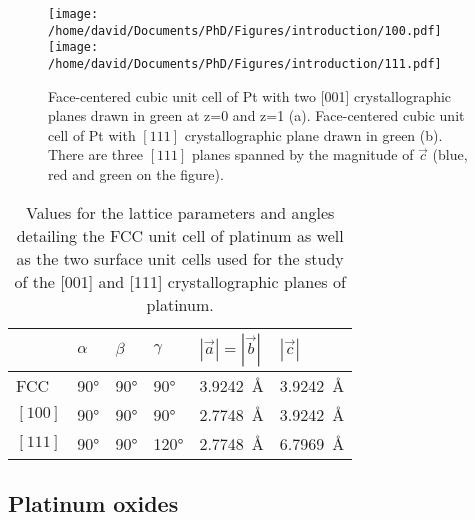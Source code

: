 \begin{figure}[!htb]
    \centering
    \texttt{[image: /home/david/Documents/PhD/Figures/introduction/100.pdf]}
    \texttt{[image: /home/david/Documents/PhD/Figures/introduction/111.pdf]}
    \caption{
        Face-centered cubic unit cell of Pt with two [001] crystallographic planes drawn in green at z=0 and z=1 (a).
        Face-centered cubic unit cell of Pt with $[111]$ crystallographic plane drawn in green (b).
        There are three $[111]$ planes spanned by the magnitude of $\vec{c}$ (blue, red and green on the figure).
    }
    \label{fig:Cubic100Hex111}
\end{figure}

\begin{table}[!htb]
    \centering
    \begin{tabular}{@{}llllll@{}}
    \toprule
     & $\alpha$ & $\beta$ & $\gamma$ & $|\vec{a}| = |\vec{b}|$ & $|\vec{c}|$ \\
    \midrule
    FCC & \ang{90} & \ang{90} & \ang{90} & \qty{3.9242}{\angstrom} & \qty{3.9242}{\angstrom} \\
    $[100]$ & \ang{90} & \ang{90} & \ang{90} & \qty{2.7748}{\angstrom} & \qty{3.9242}{\angstrom} \\
    $[111]$ & \ang{90} & \ang{90} & \ang{120} & \qty{2.7748}{\angstrom} & \qty{6.7969}{\angstrom} \\
    \bottomrule
    \end{tabular}%
    \caption{
        Values for the lattice parameters and angles detailing the FCC unit cell of platinum as well as the two surface unit cells used for the study of the [001] and [111] crystallographic planes of platinum.
        }
    \label{tab:PtStructures}
\end{table}

\subsection{Platinum oxides}

